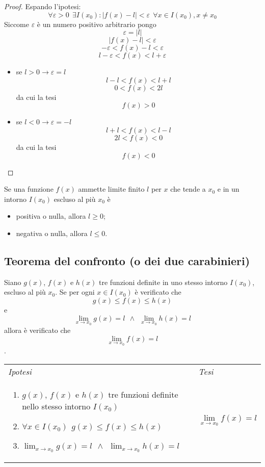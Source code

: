 \documentclass{book}     %
\begin{document}
        \begin{proof}
        Espando l'ipotesi:
        \[\forall \varepsilon > 0 ~~\exists I(x_0) : |f(x)-l|<\varepsilon~~\forall x \in I(x_0), x\neq x_0\]
        Siccome $\varepsilon$ è un numero positivo arbitrario pongo 
        \[\varepsilon = |l|\]
        \[|f(x)-l|<\varepsilon\]
        \[-\varepsilon <f(x)-l<\varepsilon\]
        \[l-\varepsilon<f(x)<l+\varepsilon\]
        \begin{itemize}
            \item se $l>0 \rightarrow \varepsilon =l$
            \[l-l<f(x)<l+l\]
            \[0<f(x)<2l\]
            da cui la tesi\[f(x)>0\]
            \item se $l<0 \rightarrow \varepsilon =-l$
            \[l+l<f(x)<l-l\]
            \[2l<f(x)<0\]
            da cui la tesi\[f(x)<0\]
        \end{itemize}
        \end{proof}
        
        \begin{shadedTheorem}
            Se una funzione $f(x)$ ammette limite finito $l$ per $x$ che tende a $x_0$ e in un intorno $I(x_0)$ escluso al più $x_0$ è 
            \begin{itemize}
                \item positiva o nulla, allora $l\geq 0$;
                \item negativa o nulla, allora $l\leq 0$.
            \end{itemize}
        \end{shadedTheorem}
        
    \subsection{Teorema del confronto (o dei due carabinieri)}
        \begin{shadedTheorem}[Confronto]
            Siano $g(x)$, $f(x)$ e $h(x)$ tre funzioni definite in uno stesso intorno $I(x_0)$, escluso al più $x_0$. Se per ogni $x\in I(x_0)$ è verificato che \[g(x)\leq f(x) \leq h(x)\]
            e \[\lim_{x\rightarrow x_0} g(x)=l ~~ \land ~~ \lim_{x\rightarrow x_0} h(x)=l\]
            allora è verificato che
            \[\lim_{x\rightarrow x_0} f(x)=l\].
        \end{shadedTheorem}
        \begin{tabular}{m{}m{}}
            \textit{Ipotesi} & \textit{Tesi}  \\
            \begin{enumerate}
                \item $g(x)$, $f(x)$ e $h(x)$ tre funzioni definite nello stesso intorno $I(x_0)$
                \item $\forall x \in I(x_0) ~~ g(x)\leq f(x) \leq h(x)$
                \item $\displaystyle\lim_{x\rightarrow x_0} g(x)=l ~~ \land ~~ \lim_{x\rightarrow x_0} h(x)=l$
            \end{enumerate} & \[\lim_{x\rightarrow x_0} f(x)=l\]\\
        \end{tabular}
        
\end{document}
